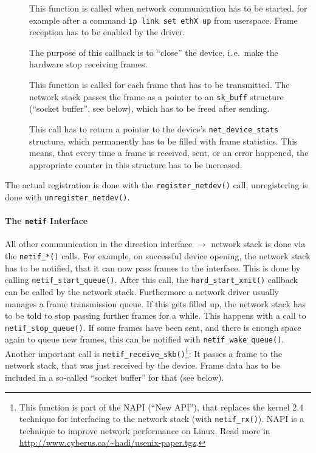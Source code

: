 \documentclass[a4paper,12pt,BCOR6mm,bibtotoc,idxtotoc]{scrbook}
\begin{document}
\begin{description}

\item[\usebox\boxopen] This function is called when network communication has
to be started, for example after a command \lstinline+ip link set ethX up+
from userspace. Frame reception has to be enabled by the driver.

\item[\usebox\boxstop] The purpose of this callback is to ``close'' the
device, i.\,e.\ make the hardware stop receiving frames.

\item[\usebox\boxxmit] This function is called for each frame that has to be
transmitted. The network stack passes the frame as a pointer to an
\lstinline+sk_buff+ structure (``socket buffer'', see
below), which has to be freed after sending.

\item[\usebox\boxstats] This call has to return a pointer to the device's
\lstinline+net_device_stats+ structure, which permanently has to be filled with
frame statistics. This means, that every time a frame is received, sent, or an
error happened, the appropriate counter in this structure has to be increased.

\end{description}

The actual registration is done with the \lstinline+register_netdev()+ call,
unregistering is done with \lstinline+unregister_netdev()+.

\paragraph{The \lstinline+netif+ Interface} All other
communication in the direction interface $\to$ network stack is done via the
\lstinline+netif_*()+ calls. For example, on successful device opening, the
network stack has to be notified, that it can now pass frames to the
interface. This is done by calling \lstinline+netif_start_queue()+. After this
call, the \lstinline+hard_start_xmit()+ callback can be called by the network
stack. Furthermore a network driver usually manages a frame transmission
queue.  If this gets filled up, the network stack has to be told to stop
passing further frames for a while. This happens with a call to
\lstinline+netif_stop_queue()+. If some frames have been sent, and there is
enough space again to queue new frames, this can be notified with
\lstinline+netif_wake_queue()+. Another important call is
\lstinline+netif_receive_skb()+\footnote{This function is part of the NAPI
(``New API''), that replaces the kernel 2.4 technique for interfacing to the
network stack (with \lstinline+netif_rx()+). NAPI is a technique to improve
network performance on Linux. Read more in
\url{http://www.cyberus.ca/~hadi/usenix-paper.tgz}.}: It passes a frame to the
network stack, that was just received by the device. Frame data has to be
included in a so-called ``socket buffer'' for that (see below).
\end{document}
